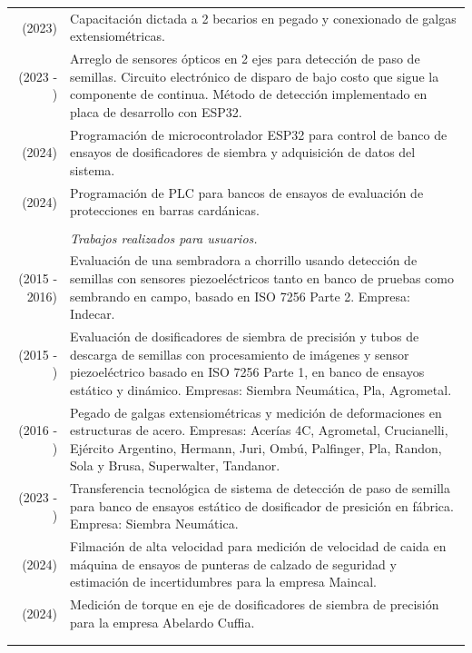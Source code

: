 \documentclass[a4paper,10pt, sans]{article}
\begin{document}
  \begin{table}[H]
  \centering
  \begin{tabularx}{\textwidth}{r X}
        (2023) & Capacitación dictada a 2 becarios en pegado y conexionado de galgas extensiométricas. \\ [1ex]
        (2023 - ) & Arreglo de sensores ópticos en 2 ejes para detección de paso de semillas. Circuito electrónico de disparo de bajo costo que sigue la componente de continua. Método de detección implementado en placa de desarrollo con ESP32. \\ [1ex]
        (2024) & Programación de microcontrolador ESP32 para control de banco de ensayos de
dosificadores de siembra y adquisición de datos del sistema. \\ [1ex]
        (2024) & Programación de PLC para bancos de ensayos de evaluación de protecciones en barras cardánicas.\\ \\
        
        
        
        
        {} & \hspace{2cm} \textit{Trabajos realizados para usuarios.} \\ [1ex]
        (2015 - 2016) & Evaluación de una sembradora a chorrillo usando detección de semillas con sensores piezoeléctricos tanto en banco de pruebas como sembrando en campo, basado en ISO 7256 Parte 2. Empresa: Indecar. \\  [1ex]

        (2015 - ) & Evaluación de dosificadores de siembra de precisión y tubos de descarga de semillas con procesamiento de imágenes y sensor piezoeléctrico basado en ISO 7256 Parte 1, en banco de ensayos estático y dinámico. Empresas: Siembra Neumática, Pla, Agrometal. \\ [1ex]
        (2016 - ) & Pegado de galgas extensiométricas y medición de deformaciones en estructuras de acero. Empresas: Acerías 4C, Agrometal, Crucianelli, Ejército Argentino, Hermann, Juri, Ombú, Palfinger, Pla, Randon, Sola y Brusa, Superwalter, Tandanor. \\ [1ex]
        (2023 - ) & Transferencia tecnológica de sistema de detección de paso de semilla para banco de ensayos estático de dosificador de presición en fábrica. Empresa: Siembra Neumática. \\ [1ex]
        (2024)&  Filmación de alta velocidad para medición de velocidad de caida en máquina de ensayos de punteras de calzado de seguridad y estimación de incertidumbres para la empresa Maincal. \\ [1ex]
        (2024) & Medición de torque en eje de dosificadores de siembra de precisión para la empresa
Abelardo Cuffia. \\ \\ \hline \\


\end{tabularx}
\end{table}
\end{document}
